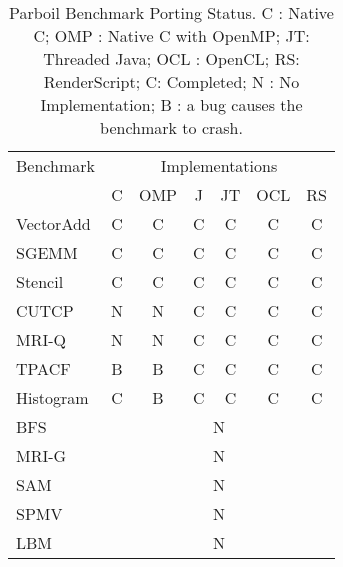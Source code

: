 \begin{table}[h]\small
\centering
\begin{tabular}{ | l | c | c | c | c | c | c |}
    \hline 
    Benchmark & \multicolumn{6}{c|}{Implementations} \\ \cline{2-7}
                      & C & OMP & J & JT & OCL & RS \\ \hline
    VectorAdd         & C & C   & C    & C      & C      & C \\ \hline
    SGEMM             & C & C   & C    & C      & C      & C \\ \hline
    Stencil           & C & C   & C    & C      & C      & C \\ \hline
    CUTCP             & N & N   & C    & C      & C      & C \\ \hline
    MRI-Q             & N & N   & C    & C      & C      & C \\ \hline
    TPACF             & B & B   & C    & C      & C      & C \\ \hline
    Histogram         & C & B   & C    & C      & C      & C \\ \hline
    BFS               & \multicolumn{6}{c|}{N} \\ \hline
    MRI-G             & \multicolumn{6}{c|}{N} \\ \hline
    SAM               & \multicolumn{6}{c|}{N} \\ \hline
    SPMV              & \multicolumn{6}{c|}{N} \\ \hline
    LBM               & \multicolumn{6}{c|}{N} \\ \hline
    \hline
\end{tabular}
\caption{Parboil Benchmark Porting Status. C : Native C; OMP : Native C with
OpenMP; JT: Threaded Java; OCL : OpenCL;  RS: RenderScript; C: Completed; N : No Implementation; B : a bug causes the benchmark to crash.}
\label{table:parboil}
\end{table}


